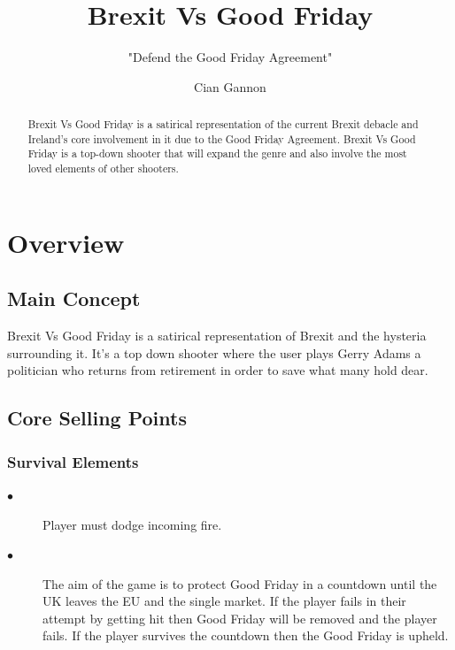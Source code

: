 \documentclass[a4paper]{scrreprt}
\title{Brexit Vs Good Friday}
\subtitle{"Defend the Good Friday Agreement"}
\author{Cian Gannon}
\begin{document}
    \maketitle

    \begin{abstract}
        
        Brexit Vs Good Friday is a satirical representation of the current Brexit debacle and Ireland's core involvement in it due to the Good Friday Agreement. 
        Brexit Vs Good Friday is a top-down shooter that will expand the genre and also involve the most loved elements of other shooters.
        
    \end{abstract}

    \tableofcontents

    \chapter{Overview}

    \section{Main Concept}
    Brexit Vs Good Friday is a satirical representation of Brexit and the hysteria surrounding it. It's a top down shooter where the user plays Gerry Adams a politician who returns from retirement in order to save what many hold dear.
    
    \section{Core Selling Points}

        \subsection{Survival Elements}
            \begin{description}
                \item[$\bullet$] Player must dodge incoming fire.
                \item[$\bullet$] The aim of the game is to protect Good Friday in a countdown until the UK leaves the EU and the single market. If the player fails in their attempt by getting hit then Good Friday will be removed and the player fails. If the player survives the countdown then the Good Friday is upheld.
            \end{description}
        
\end{document}
